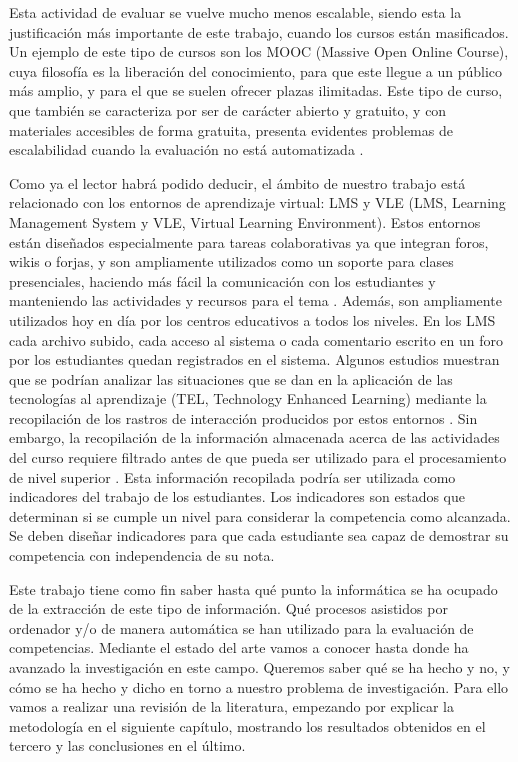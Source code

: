 Esta actividad de evaluar se vuelve mucho menos escalable, siendo esta la justificación más importante de este trabajo, cuando los cursos están masificados. Un ejemplo de este tipo de cursos son los MOOC (Massive Open Online Course), cuya filosofía es la liberación del conocimiento, para que este llegue a un público más amplio, y para el que se suelen ofrecer plazas ilimitadas. Este tipo de curso, que también se caracteriza por ser de carácter abierto y gratuito, y con materiales accesibles de forma gratuita, presenta evidentes problemas de escalabilidad cuando la evaluación no está automatizada \cite{Johnson:2013}.

Como ya el lector habrá podido deducir, el ámbito de nuestro trabajo está relacionado con los entornos de aprendizaje virtual: LMS y VLE (LMS, Learning Management System y VLE, Virtual Learning Environment). Estos entornos están diseñados especialmente para tareas colaborativas ya que integran foros, wikis o forjas, y son ampliamente utilizados como un soporte para clases presenciales, haciendo más fácil la comunicación con los estudiantes y manteniendo las actividades y recursos para el tema \cite{Zafra:2011, Munkhchimeg:2013}. Además, son ampliamente utilizados hoy en día por los centros educativos a todos los niveles. En los LMS cada archivo subido, cada acceso al sistema o cada comentario escrito en un foro por los estudiantes quedan registrados en el sistema. Algunos estudios muestran que se podrían analizar las situaciones que se dan en la aplicación de las tecnologías al aprendizaje (TEL, Technology Enhanced Learning) mediante la recopilación de los rastros de interacción producidos por estos entornos \cite{Chebil:2012}. Sin embargo, la recopilación de la información almacenada acerca de las actividades del curso requiere filtrado antes de que pueda ser utilizado para el procesamiento de nivel superior \cite{Florian:2011}. Esta información recopilada podría ser utilizada como indicadores del trabajo de los estudiantes. Los indicadores son estados que determinan si se cumple un nivel para considerar la competencia como alcanzada. Se deben diseñar indicadores para que cada estudiante sea capaz de demostrar su competencia con independencia de su nota. 

Este trabajo tiene como fin saber hasta qué punto la informática se ha ocupado de la extracción de este tipo de información. Qué procesos asistidos por ordenador y/o de manera automática se han utilizado para la evaluación de competencias. Mediante el estado del arte vamos a conocer hasta donde ha avanzado la investigación en este campo. Queremos saber qué se ha hecho y no, y cómo se ha hecho y dicho en torno a nuestro problema de investigación. Para ello vamos a realizar una revisión de la literatura, empezando por explicar la metodología en el siguiente capítulo, mostrando los resultados obtenidos en el tercero y las conclusiones en el último.




